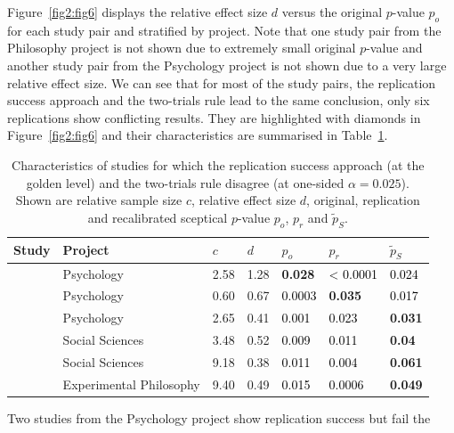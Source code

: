 Figure~\ref{fig2:fig6} displays the relative effect size $d$ versus the original
$p$-value $p_o$ for each study pair and stratified by project. Note that one
study pair from the Philosophy project is not shown due to extremely small
original $p$-value and another study pair from the Psychology project is not
shown due to a very large relative effect size. We can see that for most of the
study pairs, the replication success approach and the two-trials rule lead to
the same conclusion, only six replications show conflicting results. They are
highlighted with diamonds in Figure~\ref{fig2:fig6} and their characteristics are
summarised in Table~\ref{tbl:discrep}.
\begin{table}[!ht]
    \centering
  \caption{Characteristics of studies for which the replication success approach
    (at the golden level) and the two-trials rule disagree (at one-sided
    $\alpha = 0.025$). Shown are relative sample size $c$, relative effect size
    $d$, original, replication and recalibrated sceptical $p$-value $p_o$, $p_r$
    and $\tilde{p}_S$.}
  \label{tbl:discrep}
\resizebox{\textwidth}{!} {
\begin{tabular}{lllllll}
  \toprule
Study & Project & $c$ & $d$ & $p_o$ & $p_r$ & $\tilde{p}_S$ \\
  \midrule
\citet{Schmidt2008} & Psychology & 2.58 & 1.28 & \textbf{0.028} & \textcolor{black}{< 0.0001} & \textcolor{black}{0.024} \\
  \citet{Oberauer2008} & Psychology & 0.60 & 0.67 & \textcolor{black}{0.0003} & \textbf{0.035} & \textcolor{black}{0.017} \\
  \citet{Payne2008} & Psychology & 2.65 & 0.41 & \textcolor{black}{0.001} & \textcolor{black}{0.023} & \textbf{0.031} \\
  \citet{Balafoutas2012} & Social Sciences & 3.48 & 0.52 & \textcolor{black}{0.009} & \textcolor{black}{0.011} & \textbf{0.04} \\
  \citet{Pyc2010} & Social Sciences & 9.18 & 0.38 & \textcolor{black}{0.011} & \textcolor{black}{0.004} & \textbf{0.061} \\
  \citet{Nichols2006} & Experimental Philosophy & 9.40 & 0.49 & \textcolor{black}{0.015} & \textcolor{black}{0.0006} & \textbf{0.049} \\
   \bottomrule
\end{tabular}%
}
\end{table}
Two studies from the Psychology project show replication success but fail the
